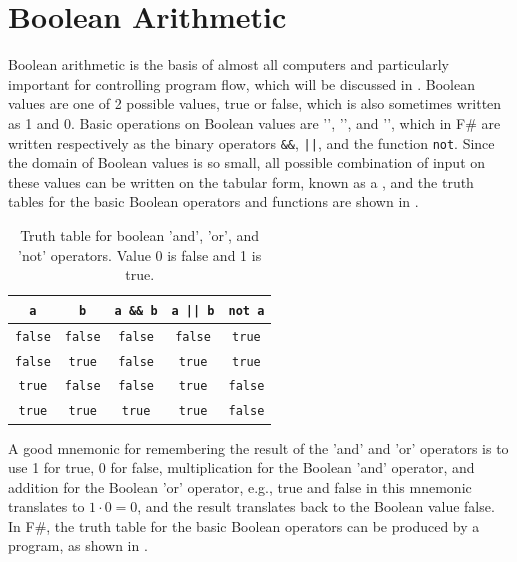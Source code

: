 \documentclass[fsharpNotes.tex]{subfiles}
\begin{document}
\section{Boolean Arithmetic}
Boolean arithmetic is the basis of almost all computers and particularly important for controlling program flow, which will be discussed in . Boolean values are one of 2 possible values, true or false, which is also sometimes written as 1 and 0. Basic operations on Boolean values are '', '', and '', which in F\# are written respectively as the binary operators \lstinline!&&!, \lstinline!||!, and the function \lstinline!not!. Since the domain of Boolean values is so small, all possible combination of input on these values can be written on the tabular form, known as a , and the truth tables for the basic Boolean operators and functions are shown in .
\begin{table}
  \centering
  \begin{tabular}{|c|c|c|c|c|}
    \hline
     \lstinline!a! & \lstinline!b! & \lstinline!a && b!& \lstinline!a || b! & \lstinline!not a!\\
    \hline
    \lstinline!false!&\lstinline!false!&\lstinline!false!&\lstinline!false!&\lstinline!true!\\
    \lstinline!false!&\lstinline!true!&\lstinline!false!&\lstinline!true!&\lstinline!true!\\
    \lstinline!true!&\lstinline!false!&\lstinline!false!&\lstinline!true!&\lstinline!false!\\
    \lstinline!true!&\lstinline!true!&\lstinline!true!&\lstinline!true!&\lstinline!false!\\
    \hline
  \end{tabular}
  \caption{Truth table for boolean 'and', 'or', and 'not' operators. Value 0 is false and 1 is true.}
  \label{tab:truthTable}
\end{table}
A good mnemonic for remembering the result of the 'and' and 'or' operators is to use 1 for true, 0 for false, multiplication for the Boolean 'and' operator, and addition for the Boolean 'or' operator, e.g., true and false in this mnemonic translates to $1\cdot 0 = 0$, and the result translates back to the Boolean value false. In F\#, the truth table for the basic Boolean operators can be produced by a program, as shown in .
%
%
\end{document}
